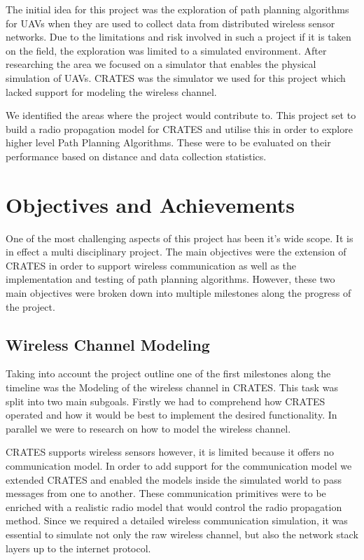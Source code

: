 The initial idea for this project was the exploration of path planning
algorithms for UAVs when they are used to collect data from distributed wireless
sensor networks. Due to the limitations and risk involved in such a project if it
is taken on the field, the exploration was limited to a simulated environment.
After researching the area we focused on a simulator that enables the physical
simulation of UAVs. CRATES was the simulator we used for this project which
lacked support for modeling the wireless channel.

We identified the areas where the project would contribute to. This project set
to build a radio propagation model for CRATES and utilise this in order to
explore higher level Path Planning Algorithms. These were to be evaluated on
their performance based on distance and data collection statistics.


\section{Objectives and Achievements}
One of the most challenging aspects of this project has been it's wide scope. It
is in effect a multi disciplinary project. The main objectives were the
extension of CRATES in order to support wireless communication as well as
the implementation and testing of path planning algorithms. However, these two
main objectives were broken down into multiple milestones along the progress of the
project.

\subsection{Wireless Channel Modeling}
Taking into account the project outline one of the first milestones along the
timeline was the Modeling of the wireless channel in CRATES. This task was split
into two main subgoals. Firstly we had to comprehend how CRATES operated and how
it would be best to implement the desired functionality. In parallel we were to
research on how to model the wireless channel.

CRATES supports wireless sensors however, it is limited because it offers no
communication model. In order to add support for the communication model we
extended CRATES and enabled the models inside the simulated world to pass
messages from one to another. These communication primitives were to be enriched
with a realistic radio model that would control the radio propagation method.
Since we required a detailed wireless communication simulation, it was
essential to simulate not only the raw wireless channel, but also the network
stack layers up to the internet protocol.

